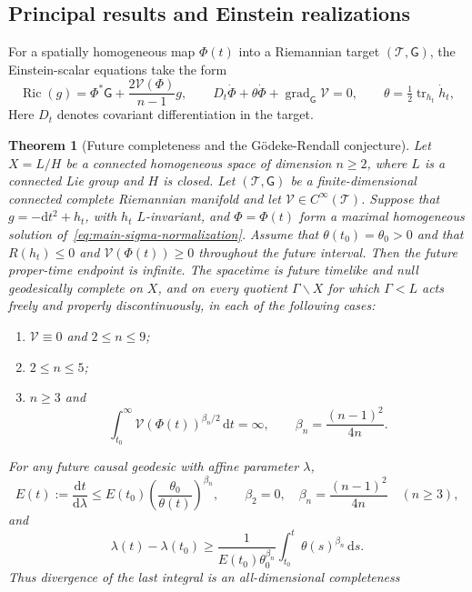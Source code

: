 \documentclass[10pt,a4paper]{article}
\numberwithin{equation}{section}
\newtheorem{theorem}{Theorem}[section]
\theoremstyle{definition}
\theoremstyle{remark}
\newcommand{\dd}{\mathrm d}
\newcommand{\Ric}{\operatorname{Ric}}
\begin{document}
\subsection{Principal results and Einstein realizations}

For a spatially homogeneous map $\Phi(t)$ into a Riemannian target
$(\mathcal T,\mathsf G)$, the Einstein-scalar equations take the form
\begin{equation}
 \Ric(g)=\Phi^*\mathsf G+\frac{2\mathcal V(\Phi)}{n-1}g,
 \qquad D_t\dot\Phi+\theta\dot\Phi+
             \operatorname{grad}_{\mathsf G}\mathcal V=0,
 \qquad \theta=\tfrac12\operatorname{tr}_{h_t}\dot h_t,
 \label{eq:main-sigma-normalization}
\end{equation}
Here $D_t$ denotes covariant differentiation in the target.

\begin{theorem}[Future completeness and the G\"odeke-Rendall conjecture]
\label{thm:homogeneous-future}
Let $X=L/H$ be a connected homogeneous space of dimension $n\ge2$,
where $L$ is a connected Lie group and $H$ is closed.  Let
$(\mathcal T,\mathsf G)$ be a finite-dimensional connected complete
Riemannian manifold and let $\mathcal V\in C^\infty(\mathcal T)$.
Suppose that $g=-\dd t^2+h_t$, with $h_t$
$L$-invariant, and $\Phi=\Phi(t)$ form a maximal homogeneous
solution of~\eqref{eq:main-sigma-normalization}.
Assume that $\theta(t_0)=\theta_0>0$ and that
$R(h_t)\le0$ and $\mathcal V(\Phi(t))\ge0$ throughout the future
interval.  Then the future
proper-time endpoint is infinite.  The spacetime is future timelike
and null geodesically complete on $X$, and on every quotient
$\Gamma\backslash X$ for which $\Gamma<L$ acts freely and properly
discontinuously, in each of the following cases:
\begin{enumerate}[label=\textup{(\roman*)}]
\item $\mathcal V\equiv0$ and $2\le n\le9$;
\item $2\le n\le5$;
\item $n\ge3$ and
\[
 \int_{t_0}^{\infty}
       \mathcal V(\Phi(t))^{\beta_n/2}\,\dd t=\infty,
 \qquad \beta_n=\frac{(n-1)^2}{4n}.
\]
\end{enumerate}
For any future causal geodesic with affine parameter $\lambda$,
\[
 E(t):=\frac{\dd t}{\dd\lambda}
 \le E(t_0)\left(\frac{\theta_0}{\theta(t)}\right)^{\beta_n},
 \qquad
 \beta_2=0,\quad \beta_n=\frac{(n-1)^2}{4n}\quad(n\ge3),
\]
and
\[
 \lambda(t)-\lambda(t_0)\ge
 \frac{1}{E(t_0)\theta_0^{\beta_n}}
 \int_{t_0}^{t}\theta(s)^{\beta_n}\,\dd s.
\]
Thus divergence of the last integral is an all-dimensional completeness

\end{theorem}
\end{document}
